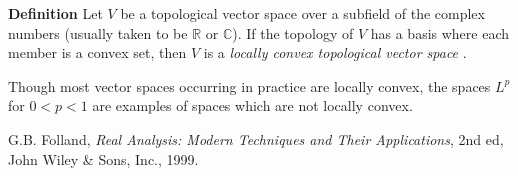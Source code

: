 \documentclass[12pt]{article}
\begin{document}
{\bf Definition} Let $V$ be a topological vector space over a subfield of the complex numbers (usually taken to be $\mathbb{R}$ or $\mathbb{C}$). If the topology of $V$ 
has a basis where each member is
a convex set, then $V$ is a \emph{locally convex topological 
vector space} \cite{folland}. 

Though most vector spaces occurring in practice are locally convex, the spaces $L^p$ for $0<p<1$ are examples of spaces which are not locally convex.

\begin{thebibliography}{9}
G.B. Folland, \emph{Real Analysis: Modern Techniques and Their Applications}, 2nd ed, John Wiley \& Sons, Inc., 1999.
 \end{thebibliography}
\end{document}
